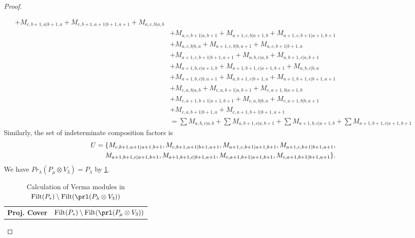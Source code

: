 \begin{proof}
\begin{enumerate}
\begin{enumerate}
\begin{equation}
\begin{aligned}
+ M_{c,b+1,a|b+1,a}
+ M_{c,b+1,a+1|b+1,a+1}
+ M_{a,c,b|a,b}\\
                                              &
+ M_{a,c,b+1|a,b+1}
+ M_{a+1,c,b|a+1,b}
+ M_{a+1,c,b+1|a+1,b+1}\\
                                              &
+ M_{a,c,b|b,a}
+ M_{a+1,c,b|b,a+1}
+ M_{a,c,b+1|b+1,a}\\
                                              &
+ M_{a+1,c,b+1|b+1,a+1}
+ M_{a,b,c|a,b}
+ M_{a,b+1,c|a,b+1}\\
                                              &
+ M_{a+1,b,c|a+1,b}
+ M_{a+1,b+1,c|a+1,b+1}
+ M_{a,b,c|b,a}\\
                                              &
+ M_{a+1,b,c|b,a+1}
+ M_{a,b+1,c|b+1,a}
+ M_{a+1,b+1,c|b+1,a+1}\\
                                              &
+ M_{c,a,b|a,b}
+ M_{c,a,b+1|a,b+1}
+ M_{c,a+1,b|a+1,b}\\
                                              &
+ M_{c,a+1,b+1|a+1,b+1}
+ M_{c,a,b|b,a}
+ M_{c,a+1,b|b,a+1}\\
                                              &
+ M_{c,a,b+1|b+1,a}
+ M_{c,a+1,b+1|b+1,a+1} \\
                                               &=
\sum M_{a,b,c|a,b}
+ \sum M_{a,b+1,c|a,b+1}
+ \sum M_{a+1,b,c|a+1,b}
+ \sum M_{a+1,b+1,c|a+1,b+1}
          \end{aligned}
        \end{equation}
      Similarly, the set of indeterminate composition factors is 
\begin{equation}\notag
  \begin{aligned}
    U = \{
M_{c,b+1,a+1|a+1,b+1},
M_{c,b+1,a+1|b+1,a+1},
M_{a+1,c,b+1|a+1,b+1},
M_{a+1,c,b+1|b+1,a+1},\\
M_{a+1,b+1,c|a+1,b+1},
M_{a+1,b+1,c|b+1,a+1},
M_{c,a+1,b+1|a+1,b+1},
M_{c,a+1,b+1|b+1,a+1}
\}.
  \end{aligned}
\end{equation}
       We have $Pr_{\lambda}(P_\mu \otimes V_{3}) = P_\lambda  $ by \cref{tab:verma-analysis_c_7}.
\begin{table}[htbp]
\centering
\caption{Calculation of Verma modules in $\operatorname{Filt}(P_*) \setminus \operatorname{Filt}(\prl(P_\lambda \otimes V_{3})) $ } \label{tab:verma-analysis_c_7}
\begin{tabular}{cc}
\toprule
\textbf{Proj. Cover} & \textbf{$\operatorname{Filt}(P_*) \setminus \operatorname{Filt}(\prl(P_\mu \otimes V_{3})) $}  \\

\end{tabular}
\end{table}
\end{enumerate}
\end{enumerate}
\end{proof}
